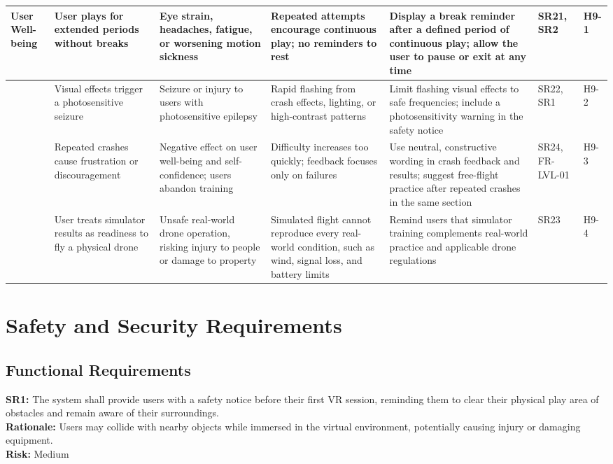 \documentclass{article}
\newif\iflandscapefooter
\newcommand{\reqdef}[1]{\textbf{#1:}}
\newcommand{\reqref}[1]{#1}
\begin{document}
\begin{landscape}
\begin{longtable}{|L{1.9cm}|L{2.6cm}|L{3.0cm}|L{2.8cm}|L{3.8cm}|L{1.9cm}|L{0.8cm}|}
User Well-being &
User plays for extended periods without breaks &
Eye strain, headaches, fatigue, or worsening motion sickness &
Repeated attempts encourage continuous play; no reminders to rest &
Display a break reminder after a defined period of continuous play; allow the
user to pause or exit at any time &
\reqref{SR21}, \reqref{SR2} &
H9-1 \\
\hline
&
Visual effects trigger a photosensitive seizure &
Seizure or injury to users with photosensitive epilepsy &
Rapid flashing from crash effects, lighting, or high-contrast patterns &
Limit flashing visual effects to safe frequencies; include a photosensitivity
warning in the safety notice &
\reqref{SR22}, \reqref{SR1} &
H9-2 \\
\hline
&
Repeated crashes cause frustration or discouragement &
Negative effect on user well-being and self-confidence; users abandon training &
Difficulty increases too quickly; feedback focuses only on failures &
Use neutral, constructive wording in crash feedback and results; suggest
free-flight practice after repeated crashes in the same section &
\reqref{SR24}, FR-LVL-01 &
H9-3 \\
\hline
&
User treats simulator results as readiness to fly a physical drone &
Unsafe real-world drone operation, risking injury to people or damage to
property &
Simulated flight cannot reproduce every real-world condition, such as wind,
signal loss, and battery limits &
Remind users that simulator training complements real-world practice and
applicable drone regulations &
\reqref{SR23} &
H9-4 \\
\hline
\end{longtable}
\end{landscape}
\global\landscapefooterfalse

\section{Safety and Security Requirements}\label{sec:safety-reqs}

\subsection{Functional Requirements}

\noindent
\reqdef{SR1} The system shall provide users with a safety notice before their first VR session, reminding them to clear their physical play area of obstacles and remain aware of their surroundings.\\
\textbf{Rationale:} Users may collide with nearby objects while immersed in the virtual environment, potentially causing injury or damaging equipment.\\
\textbf{Risk:} Medium\\[1em]
\end{document}
